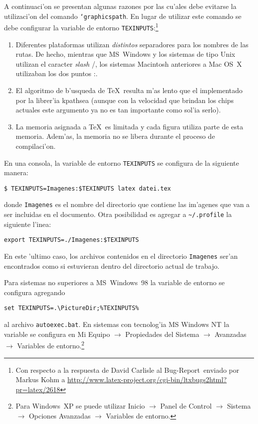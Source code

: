\documentclass[11pt,a4paper,pagesize,tablecaptionabove,abstracton,pointlessnumbers]{scrartcl}
\newcommand{\gl}{\guillemotleft}
\newcommand{\gr}{\guillemotright}
\DeclareRobustCommand*{\Macro}[1]{\mbox{\texttt{\char`\\#1}}}
\begin{document}
A continuaci'on se presentan algunas razones por las cu'ales debe evitarse la utilizaci'on del comando \Macro{graphicspath}. En lugar de utilizar este comando se debe configurar la variable de entorno
\texttt{TEXINPUTS}:\footnote{Con respecto a la respuesta de David Carlisle al \gl Bug-Report\gr\ enviado por Markus  Kohm  a\newline
  \url{http://www.latex-project.org/cgi-bin/ltxbugs2html?pr=latex/2618}}
\begin{enumerate}
  \item Diferentes plataformas utilizan \emph{distintos} separadores para los nombres de las rutas. De hecho, mientras que MS~Windows y los sistemas de tipo Unix utilizan el caracter \textit{slash} \gl /\gr, los sistemas Macintosh anteriores a Mac OS~X utilizaban los dos puntos \gl :\gr.
  \item El algoritmo de b'usqueda de \TeX{}\ resulta m'as lento que el implementado por la librer'ia kpathsea (aunque con la velocidad que brindan los chips actuales este argumento ya no es tan importante como sol'ia serlo).
  \item La memoria asignada a \TeX\ es limitada y cada figura utiliza parte de esta memoria. Adem'as, la memoria no se libera durante el proceso de compilaci'on.
\end{enumerate}
%
En una consola, la variable de entorno \texttt{TEXINPUTS} se configura de la siguiente manera:
\begin{verbatim}
$ TEXINPUTS=Imagenes:$TEXINPUTS latex datei.tex
\end{verbatim}
donde \texttt{Imagenes} es el nombre del directorio que contiene las im'agenes que van a ser incluidas en el documento. Otra posibilidad es agregar a \verb+~/.profile+ la siguiente l'inea:
\begin{verbatim}
export TEXINPUTS=./Imagenes:$TEXINPUTS
\end{verbatim}%
En este 'ultimo caso, los archivos contenidos en el directorio \texttt{Imagenes} ser'an encontrados como si estuvieran dentro del directorio actual de trabajo.

\noindent
Para sistemas no superiores a MS~Windows~98 la variable de entorno se configura agregando
\begin{verbatim}
set TEXINPUTS=.\PictureDir;%TEXINPUTS%
\end{verbatim}
al archivo \texttt{autoexec.bat}. En sistemas con tecnolog'ia MS Windows NT la variable se configura en \textsf{Mi Equipo $\rightarrow$ Propiedades del Sistema $\rightarrow$ Avanzadas $\rightarrow$ Variables de entorno}.\footnote{Para Windows~XP se puede utilizar \textsf{Inicio} $\rightarrow$ Panel de Control $\rightarrow$ Sistema $\rightarrow$ Opciones Avanzadas $\rightarrow$ Variables de entorno.}
\end{document}
